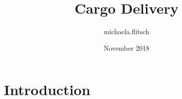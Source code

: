 \documentclass{article}
\title{Cargo Delivery}
\author{michaela.flitsch }
\date{November 2018}
\begin{document}
\maketitle

\section{Introduction}
\end{document}
